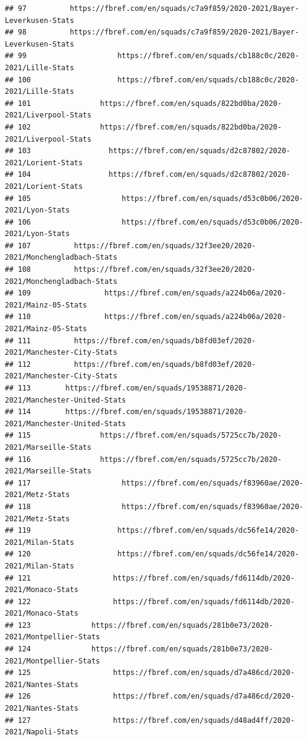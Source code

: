 \documentclass[
]{book}
\theoremstyle{definition}
\theoremstyle{definition}
\theoremstyle{definition}
\theoremstyle{definition}
\theoremstyle{remark}
\begin{document}
\begin{verbatim}
## 97          https://fbref.com/en/squads/c7a9f859/2020-2021/Bayer-Leverkusen-Stats
## 98          https://fbref.com/en/squads/c7a9f859/2020-2021/Bayer-Leverkusen-Stats
## 99                     https://fbref.com/en/squads/cb188c0c/2020-2021/Lille-Stats
## 100                    https://fbref.com/en/squads/cb188c0c/2020-2021/Lille-Stats
## 101                https://fbref.com/en/squads/822bd0ba/2020-2021/Liverpool-Stats
## 102                https://fbref.com/en/squads/822bd0ba/2020-2021/Liverpool-Stats
## 103                  https://fbref.com/en/squads/d2c87802/2020-2021/Lorient-Stats
## 104                  https://fbref.com/en/squads/d2c87802/2020-2021/Lorient-Stats
## 105                     https://fbref.com/en/squads/d53c0b06/2020-2021/Lyon-Stats
## 106                     https://fbref.com/en/squads/d53c0b06/2020-2021/Lyon-Stats
## 107          https://fbref.com/en/squads/32f3ee20/2020-2021/Monchengladbach-Stats
## 108          https://fbref.com/en/squads/32f3ee20/2020-2021/Monchengladbach-Stats
## 109                 https://fbref.com/en/squads/a224b06a/2020-2021/Mainz-05-Stats
## 110                 https://fbref.com/en/squads/a224b06a/2020-2021/Mainz-05-Stats
## 111          https://fbref.com/en/squads/b8fd03ef/2020-2021/Manchester-City-Stats
## 112          https://fbref.com/en/squads/b8fd03ef/2020-2021/Manchester-City-Stats
## 113        https://fbref.com/en/squads/19538871/2020-2021/Manchester-United-Stats
## 114        https://fbref.com/en/squads/19538871/2020-2021/Manchester-United-Stats
## 115                https://fbref.com/en/squads/5725cc7b/2020-2021/Marseille-Stats
## 116                https://fbref.com/en/squads/5725cc7b/2020-2021/Marseille-Stats
## 117                     https://fbref.com/en/squads/f83960ae/2020-2021/Metz-Stats
## 118                     https://fbref.com/en/squads/f83960ae/2020-2021/Metz-Stats
## 119                    https://fbref.com/en/squads/dc56fe14/2020-2021/Milan-Stats
## 120                    https://fbref.com/en/squads/dc56fe14/2020-2021/Milan-Stats
## 121                   https://fbref.com/en/squads/fd6114db/2020-2021/Monaco-Stats
## 122                   https://fbref.com/en/squads/fd6114db/2020-2021/Monaco-Stats
## 123              https://fbref.com/en/squads/281b0e73/2020-2021/Montpellier-Stats
## 124              https://fbref.com/en/squads/281b0e73/2020-2021/Montpellier-Stats
## 125                   https://fbref.com/en/squads/d7a486cd/2020-2021/Nantes-Stats
## 126                   https://fbref.com/en/squads/d7a486cd/2020-2021/Nantes-Stats
## 127                   https://fbref.com/en/squads/d48ad4ff/2020-2021/Napoli-Stats

\end{verbatim}
\end{document}
